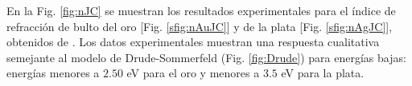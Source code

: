 \documentclass[letterpaper,11pt] {article}
\begin{document}
En la Fig.  \ref{fig:nJC} se muestran los resultados experimentales para el índice de refracción de bulto del oro [Fig.  \ref{sfig:nAuJC}] y de la plata [Fig.  \ref{sfig:nAgJC}], obtenidos de  \cite{johnson1972contants}.  Los datos experimentales muestran una respuesta cualitativa semejante al modelo de Drude-Sommerfeld (Fig.  \ref{fig:Drude}) para energías bajas: energías menores a $2. 50$ eV para el oro y menores a $3. 5$ eV para la plata. %
\end{document}
